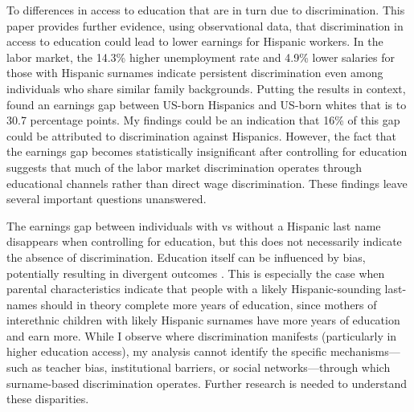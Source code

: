 To differences in access to education that are in turn due to discrimination. This paper provides further evidence, using observational data, that discrimination in access to education could lead to lower earnings for Hispanic workers.
In the labor market, the 14.3\% higher unemployment rate and 4.9\% lower salaries for those with Hispanic surnames indicate persistent discrimination even among individuals who share similar family backgrounds. Putting the results in context, \autocite{trejoWhyMexicanAmericans1997} found an earnings gap between US-born Hispanics and US-born whites that is to 30.7 percentage points.  My findings could be an indication that 16\% of this gap could be attributed to discrimination against Hispanics. However, the fact that the earnings gap becomes statistically insignificant after controlling for education suggests that much of the labor market discrimination operates through educational channels rather than direct wage discrimination. These findings leave several important questions unanswered.

The earnings gap between individuals with vs without a Hispanic last name disappears when controlling for education, but this does not necessarily indicate the absence of discrimination. Education itself can be influenced by bias, potentially resulting in divergent outcomes \autocite{bergman2018education,gaddis2024racial}. This is especially the case when parental characteristics indicate that people with a likely Hispanic-sounding last-names should in theory complete more years of education, since mothers of interethnic children with likely Hispanic surnames have more years of education and earn more. While I observe where discrimination manifests (particularly in higher education access), my analysis cannot identify the specific mechanisms—such as teacher bias, institutional barriers, or social networks—through which surname-based discrimination operates. Further research is needed to understand these disparities.
